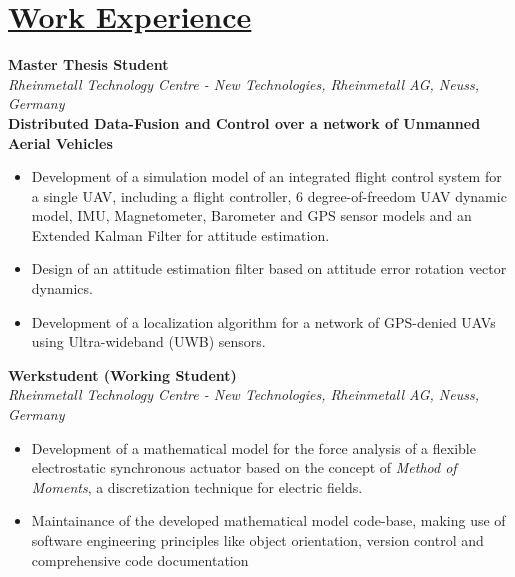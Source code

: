 
\section{\underline{Work Experience}}

\large{\textbf{Master Thesis Student}}
\hfill
\masterarbeitdate\\
\large{\emph{Rheinmetall Technology Centre - New Technologies, Rheinmetall AG, Neuss, Germany}}\\
\large{\textbf{Distributed Data-Fusion and Control over a network of Unmanned Aerial Vehicles}}
\begin{itemize}
    \item Development of a simulation model of an integrated flight control system for a single UAV, including a flight controller, 6 degree-of-freedom UAV dynamic model, IMU, Magnetometer, Barometer and GPS sensor models and an Extended Kalman Filter for attitude estimation.
    \item Design of an attitude estimation filter based on attitude error rotation vector dynamics.
    \item Development of a localization algorithm for a network of GPS-denied UAVs using Ultra-wideband (UWB) sensors.
\end{itemize}

\vspace{0.1 in}

\large{\textbf{Werkstudent (Working Student)}}
\hfill
\rheinmetalldate\\
\large{\emph{Rheinmetall Technology Centre - New Technologies, Rheinmetall AG, Neuss, Germany}}
\begin{itemize}
\item\large{Development of a mathematical model for the force analysis of a flexible electrostatic synchronous actuator based on the concept of \emph{Method of Moments}, a discretization technique for electric fields.}
\item\large{Maintainance of the developed mathematical model code-base, making use of software engineering principles like object orientation, version control and comprehensive code documentation}
\end{itemize}

